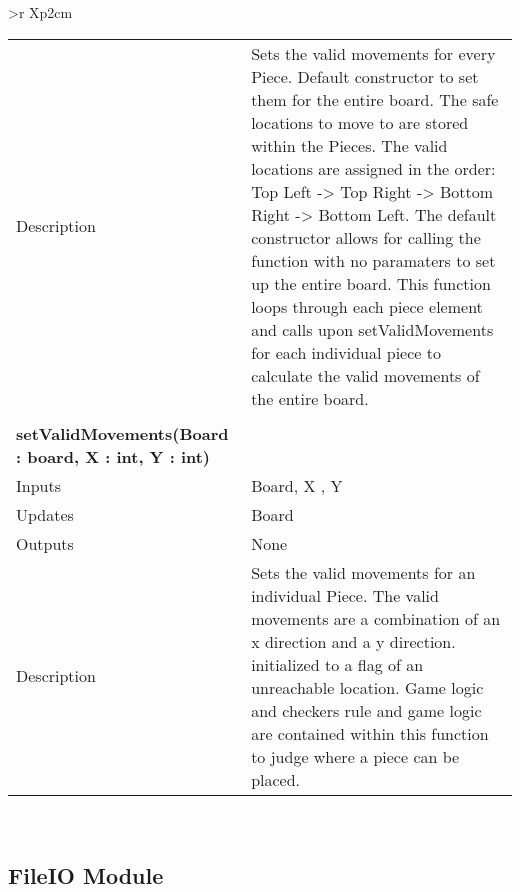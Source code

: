 \documentclass[10pt]{article}
\makeatletter
\newcommand{\CustomLabel}[1]{\Hy@raisedlink{\hypertarget{#1}{}}\label{#1}}
\makeatother
\begin{document}
\begin{longtabu}{ >{\bfseries}r Xp{2cm} }
\begin{tabular}[t]{@{} p{4cm} p{8cm}}
                                    Description & Sets the valid movements for every Piece. Default constructor to set them for the entire board. The safe locations to move to are stored within the Pieces. The valid locations are assigned in the order: Top Left -> Top Right -> Bottom Right -> Bottom Left. The default constructor allows for calling the function with no paramaters to set up the entire board. This function loops through each piece element and calls upon setValidMovements for each individual piece to calculate the valid movements of the entire board. \\
                                    & \\
                                    \bf{setValidMovements(Board : board, X : int, Y : int)} & \\
                                    Inputs & Board, X , Y \\
                                    Updates & Board \\
                                    Outputs & None \\
                                    Description & Sets the valid movements for an individual Piece. The valid movements are a combination of an x direction and a y direction. initialized to a flag of an unreachable location. Game logic and checkers rule and game logic are contained within this function to judge where a piece can be placed. \\
                              \end{tabular} \\
        \end{longtabu}


        
        

\subsection{FileIO Module}\CustomLabel{mis:LoadSave}
\end{document}
